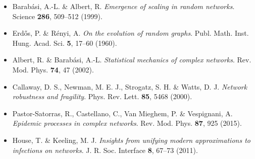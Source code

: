 \documentclass[a4paper, 11pt]{article}
\begin{document}
\begin{itemize}
\item Barabási, A.-L. \& Albert, R. \textit{Emergence of scaling in random networks}. Science \textbf{286}, 509–512 (1999).
\item Erdős, P. \& Rényi, A. \textit{On the evolution of random graphs}. Publ. Math. Inst. Hung. Acad. Sci. \textbf{5}, 17–60 (1960).
\item Albert, R. \& Barabási, A.-L. \textit{Statistical mechanics of complex networks}. Rev. Mod. Phys. \textbf{74}, 47 (2002).
\item Callaway, D. S., Newman, M. E. J., Strogatz, S. H. \& Watts, D. J. \textit{Network robustness and fragility}. Phys. Rev. Lett. \textbf{85}, 5468 (2000).
\item Pastor-Satorras, R., Castellano, C., Van Mieghem, P. \& Vespignani, A. \textit{Epidemic processes in complex networks}. Rev. Mod. Phys. \textbf{87}, 925 (2015).
\item House, T. \& Keeling, M. J. \textit{Insights from unifying modern approximations to infections on networks}. J. R. Soc. Interface \textbf{8}, 67–73 (2011).
\end{itemize}
\end{document}
